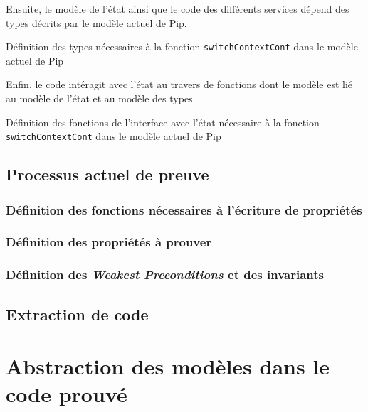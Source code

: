 		Ensuite, le modèle de l'état ainsi que le code des différents services dépend des types décrits par le modèle actuel de Pip.

		\begin{listing}[!ht]
			\caption{Définition des types nécessaires à la fonction \texttt{switchContextCont} dans le modèle actuel de Pip}
			\label{code:CurrentTypesModel}
		\end{listing}

		Enfin, le code intéragit avec l'état au travers de fonctions dont le modèle est lié au modèle de l'état et au modèle des types.

		\begin{listing}[!ht]
			\caption{Définition des fonctions de l'interface avec l'état nécessaire à la fonction \texttt{switchContextCont} dans le modèle actuel de Pip}
			\label{code:CurrentFunctionsModel}
		\end{listing}

		\subsection{Processus actuel de preuve}

			\subsubsection{Définition des fonctions nécessaires à l'écriture de propriétés}

			\subsubsection{Définition des propriétés à prouver}

			\subsubsection{Définition des \emph{Weakest Preconditions} et des invariants}

		\subsection{Extraction de code}

		
	\section{Abstraction des modèles dans le code prouvé}

